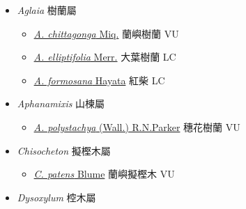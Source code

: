 
  \begin{itemize}
 \item[] \textit{Aglaia} 樹蘭屬
                    
  \begin{itemize}
        \item[] \href{http://www.theplantlist.org/tpl1.1/search?q=Aglaia+chittagonga}{\textit{A. chittagonga} Miq.}   蘭嶼樹蘭 VU
        \item[] \href{http://www.theplantlist.org/tpl1.1/search?q=Aglaia+elliptifolia}{\textit{A. elliptifolia} Merr.}   大葉樹蘭 LC
        \item[] \href{http://www.theplantlist.org/tpl1.1/search?q=Aglaia+formosana}{\textit{A. formosana} Hayata}   紅柴 LC
  \end{itemize}
 \item[] \textit{Aphanamixis} 山楝屬
                    
  \begin{itemize}
        \item[] \href{http://www.theplantlist.org/tpl1.1/search?q=Aphanamixis+polystachya}{\textit{A. polystachya} (Wall.) R.N.Parker}   穗花樹蘭 VU
  \end{itemize}
 \item[] \textit{Chisocheton} 擬樫木屬
                    
  \begin{itemize}
        \item[] \href{http://www.theplantlist.org/tpl1.1/search?q=Chisocheton+patens}{\textit{C. patens} Blume}   蘭嶼擬樫木 VU
  \end{itemize}
 \item[] \textit{Dysoxylum} 椌木屬
                    

\end{itemize}
